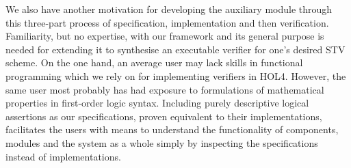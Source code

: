 \documentclass[10pt,conference]{IEEEtran}
\begin{document}
We also have another motivation for developing the auxiliary module through this three-part process of specification, implementation and then verification. Familiarity, but no expertise, with our framework and its general purpose is needed for extending it to synthesise an executable verifier for one's desired STV scheme. On the one hand, an average user may lack skills in functional programming which we rely on for implementing verifiers in HOL4. However, the same user most probably has had exposure to formulations of mathematical properties  in first-order logic syntax. Including purely descriptive logical assertions as our specifications, proven equivalent to their implementations, facilitates the users with means to understand the functionality of components, modules and the system as a whole simply by inspecting the specifications instead of implementations.
\end{document}
